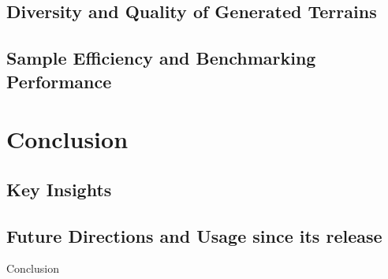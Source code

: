 \documentclass[aspectratio=169,xcolor=dvipsnames]{beamer}
\begin{document}
\subsection{Diversity and Quality of Generated Terrains}

\subsection{Sample Efficiency and Benchmarking Performance}


\section{Conclusion}

\subsection{Key Insights}

\subsection{Future Directions and Usage since its release}

\begin{frame}{Conclusion}

\end{frame}
\end{document}
